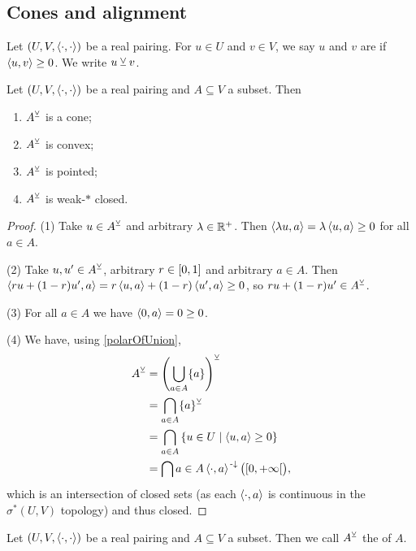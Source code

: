 \subsection{Cones and alignment}
\begin{definition}
Let $\sSet{U,V,\pair{\cdot,\cdot}}$ be a real pairing. For $u\in U$ and $v\in V$, we say $u$ and $v$ are  if $\left\langle u,v \right\rangle\geq 0$. We write $u \veebar v$.
\end{definition}

\begin{lemma} \label{dualConeProperties}
Let $\sSet{U,V,\pair{\cdot,\cdot}}$ be a real pairing and $A\subseteq V$ a subset. Then
\begin{enumerate}
\item $A^\veebar$ is a cone;
\item $A^\veebar$ is convex;
\item $A^\veebar$ is pointed;
\item $A^\veebar$ is weak-$*$ closed.
\end{enumerate}
\end{lemma}
\begin{proof}
(1) Take $u\in A^\veebar$ and arbitrary $\lambda\in\mathbb{R}^+$. Then $\left\langle \lambda u, a \right\rangle = \lambda \left\langle u, a \right\rangle \geq 0$ for all $a\in A$.

(2) Take $u,u'\in A^\veebar$, arbitrary $r\in \interval{0,1}$ and arbitrary $a\in A$. Then $\left\langle ru+ (1-r)u', a \right\rangle = r\left\langle u, a \right\rangle+ (1-r)\left\langle u', a \right\rangle \geq 0$, so $ru+(1-r)u'\in A^\veebar$.

(3) For all $a\in A$ we have $\left\langle 0, a \right\rangle = 0 \geq 0$.

(4) We have, using \ref{polarOfUnion},
\begin{align*}
A^\pairingAligned &= \left(\bigcup_{a\in A}\{a\}\right)^\pairingAligned \\
&= \bigcap_{a\in A} \{a\}^\pairingAligned \\
&= \bigcap_{a\in A}\setbuilder{u\in U}{\pair{u,a}\geq 0} \\
&= \bigcap{a\in A}\pair{\cdot, a}^{\preimf}\big(\interval[co]{0,+\infty}\big),
\end{align*}
which is an intersection of closed sets (as each $\left\langle \cdot, a \right\rangle$ is continuous in the $\sigma^*(U,V)$ topology) and thus closed.
\end{proof}

\begin{definition}
Let $\sSet{U,V,\pair{\cdot,\cdot}}$ be a real pairing and $A\subseteq V$ a subset. Then we call $A^\veebar$ the  of $A$.
\end{definition}

